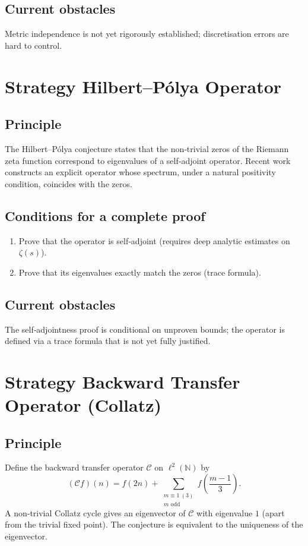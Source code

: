 \documentclass[11pt,a4paper]{article}
\begin{document}
\subsection{Current obstacles}
Metric independence is not yet rigorously established; discretisation errors are hard to control.

\section{Strategy Hilbert–Pólya Operator}

\subsection{Principle}
The Hilbert–Pólya conjecture states that the non‑trivial zeros of the Riemann zeta function correspond to eigenvalues of a self‑adjoint operator. Recent work constructs an explicit operator whose spectrum, under a natural positivity condition, coincides with the zeros.

\subsection{Conditions for a complete proof}
\begin{enumerate}
\item Prove that the operator is self‑adjoint (requires deep analytic estimates on \(\zeta(s)\)).
\item Prove that its eigenvalues exactly match the zeros (trace formula).
\end{enumerate}

\subsection{Current obstacles}
The self‑adjointness proof is conditional on unproven bounds; the operator is defined via a trace formula that is not yet fully justified.

\section{Strategy Backward Transfer Operator (Collatz)}

\subsection{Principle}
Define the backward transfer operator \(\mathcal{C}\) on \(\ell^2(\mathbb{N})\) by
\[
(\mathcal{C}f)(n) = f(2n) + \sum_{\substack{m\equiv 1\ (3)\\ m\text{ odd}}} f\!\left(\frac{m-1}{3}\right).
\]
A non‑trivial Collatz cycle gives an eigenvector of \(\mathcal{C}\) with eigenvalue \(1\) (apart from the trivial fixed point). The conjecture is equivalent to the uniqueness of the eigenvector.
\end{document}
